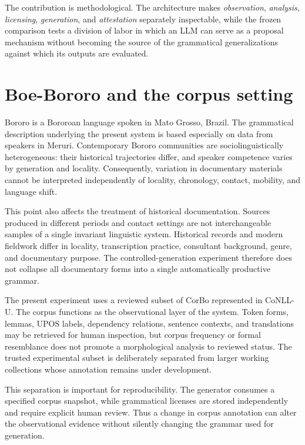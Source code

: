 \documentclass[11pt]{article}
\begin{document}
The contribution is methodological. The architecture makes
\emph{observation}, \emph{analysis}, \emph{licensing}, \emph{generation},
and \emph{attestation} separately inspectable, while the frozen comparison
tests a division of labor in which an LLM can serve as a proposal mechanism
without becoming the source of the grammatical generalizations against which
its outputs are evaluated.

\section{Boe-Bororo and the corpus setting}
\label{sec:bororo}

Bororo is a Bororoan language spoken in Mato Grosso, Brazil. The grammatical
description underlying the present system is based especially on data from
speakers in Meruri. Contemporary Bororo communities are sociolinguistically
heterogeneous: their historical trajectories differ, and speaker competence
varies by generation and locality. Consequently, variation in documentary
materials cannot be interpreted independently of locality, chronology, contact,
mobility, and language shift.

This point also affects the treatment of historical documentation. Sources
produced in different periods and contact settings are not interchangeable
samples of a single invariant linguistic system. Historical records and modern
fieldwork differ in locality, transcription practice, consultant background,
genre, and documentary purpose. The controlled-generation experiment therefore
does not collapse all documentary forms into a single automatically productive
grammar.

The present experiment uses a reviewed subset of CorBo represented in CoNLL-U.
The corpus functions as the observational layer of the system. Token forms,
lemmas, UPOS labels, dependency relations, sentence contexts, and translations
may be retrieved for human inspection, but corpus frequency or formal
resemblance does not promote a morphological analysis to reviewed status. The
trusted experimental subset is deliberately separated from larger working
collections whose annotation remains under development.

This separation is important for reproducibility. The generator consumes a
specified corpus snapshot, while grammatical licenses are stored independently
and require explicit human review. Thus a change in corpus annotation can alter
the observational evidence without silently changing the grammar used for
generation.
\end{document}
